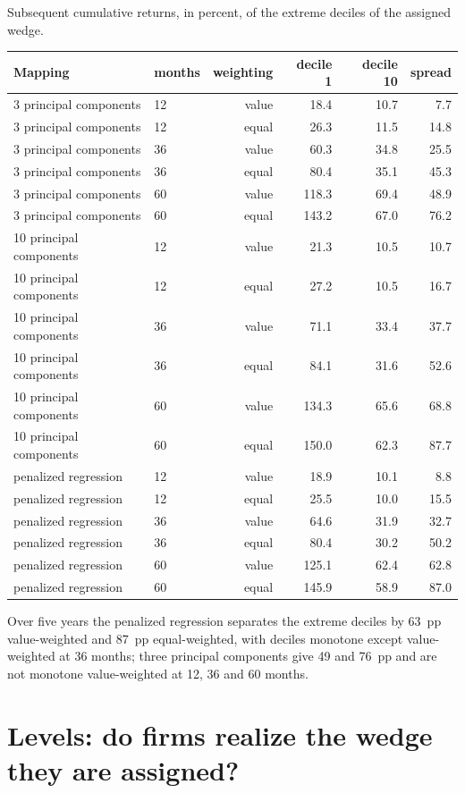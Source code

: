 \documentclass[11pt]{article}
\begin{document}
\begin{tbl}{Subsequent cumulative returns, in percent, of the extreme deciles of the assigned wedge.}
\begin{tabular}{llrrrr}\toprule
Mapping & months & weighting & decile 1 & decile 10 & spread\\\midrule
3 principal components & 12 & value & 18.4 & 10.7 & 7.7\\
3 principal components & 12 & equal & 26.3 & 11.5 & 14.8\\
3 principal components & 36 & value & 60.3 & 34.8 & 25.5\\
3 principal components & 36 & equal & 80.4 & 35.1 & 45.3\\
3 principal components & 60 & value & 118.3 & 69.4 & 48.9\\
3 principal components & 60 & equal & 143.2 & 67.0 & 76.2\\
10 principal components & 12 & value & 21.3 & 10.5 & 10.7\\
10 principal components & 12 & equal & 27.2 & 10.5 & 16.7\\
10 principal components & 36 & value & 71.1 & 33.4 & 37.7\\
10 principal components & 36 & equal & 84.1 & 31.6 & 52.6\\
10 principal components & 60 & value & 134.3 & 65.6 & 68.8\\
10 principal components & 60 & equal & 150.0 & 62.3 & 87.7\\
penalized regression & 12 & value & 18.9 & 10.1 & 8.8\\
penalized regression & 12 & equal & 25.5 & 10.0 & 15.5\\
penalized regression & 36 & value & 64.6 & 31.9 & 32.7\\
penalized regression & 36 & equal & 80.4 & 30.2 & 50.2\\
penalized regression & 60 & value & 125.1 & 62.4 & 62.8\\
penalized regression & 60 & equal & 145.9 & 58.9 & 87.0\\
\bottomrule
\end{tabular}
\end{tbl}

Over five years the penalized regression separates the extreme deciles by
63~pp value-weighted and 87~pp equal-weighted, with deciles monotone except value-weighted at 36 months;
three principal components give 49 and 76~pp and are not monotone value-weighted at 12, 36 and 60 months.

\section{Levels: do firms realize the wedge they are assigned?}
\end{document}
